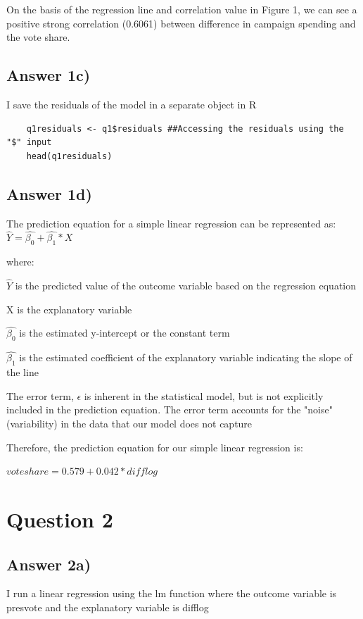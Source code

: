 \documentclass{article}
\begin{document}
On the basis of the regression line and correlation value in Figure 1, we can see a positive strong correlation (0.6061) between difference in campaign spending and the vote share. 

\subsection{Answer 1c)}
I save the residuals of the model in a separate object in R
\begin{verbatim}
    q1residuals <- q1$residuals ##Accessing the residuals using the "$" input
    head(q1residuals)

\end{verbatim}
\subsection{Answer 1d)}
The prediction equation for a simple linear regression can be represented as:
\begin{math} \hat{Y} = \hat{\beta_0} + \hat{\beta_1} * X  \end{math} 

where:

\noindent $\hat{Y}$ is the predicted value of the outcome variable based on the regression equation

\noindent X is the explanatory variable

\noindent $\hat{\beta_0}$ is the estimated y-intercept or the constant term

\noindent $\hat{\beta_1}$ is the estimated coefficient of the explanatory variable indicating the slope of the line

\noindent The error term, $\epsilon$ is inherent in the statistical model, but is not explicitly included in the prediction equation. The error term accounts for the "noise" (variability) in the data that our model does not capture

\vspace{0.3cm}
\noindent Therefore, the prediction equation for our simple linear regression is:

\begin{math}
    vote share = 0.579 + 0.042 * difflog 
\end{math}
\pagebreak
\section{Question 2}

\subsection{Answer 2a)}
I run a linear regression using the lm function where the outcome variable is presvote and the explanatory variable is difflog
\end{document}
